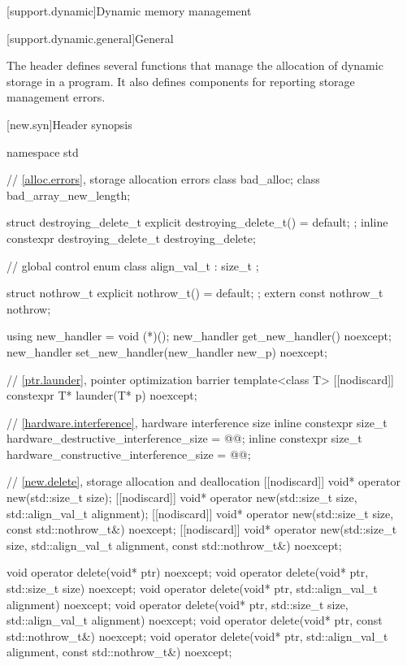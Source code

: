 
[support.dynamic]{Dynamic memory management}

[support.dynamic.general]{General}

\pnum
The header  defines several
functions that manage the allocation of dynamic storage in a program.
It also defines components for reporting storage management errors.

[new.syn]{Header  synopsis}
\begin{codeblock}
namespace std {
  // \ref{alloc.errors}, storage allocation errors
  class bad_alloc;
  class bad_array_new_length;

  struct destroying_delete_t {
    explicit destroying_delete_t() = default;
  };
  inline constexpr destroying_delete_t destroying_delete{};

  // global  control%
  enum class align_val_t : size_t {};

  struct nothrow_t { explicit nothrow_t() = default; };
  extern const nothrow_t nothrow;

  using new_handler = void (*)();
  new_handler get_new_handler() noexcept;
  new_handler set_new_handler(new_handler new_p) noexcept;

  // \ref{ptr.launder}, pointer optimization barrier
  template<class T> [[nodiscard]] constexpr T* launder(T* p) noexcept;

  // \ref{hardware.interference}, hardware interference size
  inline constexpr size_t hardware_destructive_interference_size = @\impdef{}@;
  inline constexpr size_t hardware_constructive_interference_size = @\impdef{}@;
}

// \ref{new.delete}, storage allocation and deallocation
[[nodiscard]] void* operator new(std::size_t size);
[[nodiscard]] void* operator new(std::size_t size, std::align_val_t alignment);
[[nodiscard]] void* operator new(std::size_t size, const std::nothrow_t&) noexcept;
[[nodiscard]] void* operator new(std::size_t size, std::align_val_t alignment,
                                 const std::nothrow_t&) noexcept;

void  operator delete(void* ptr) noexcept;
void  operator delete(void* ptr, std::size_t size) noexcept;
void  operator delete(void* ptr, std::align_val_t alignment) noexcept;
void  operator delete(void* ptr, std::size_t size, std::align_val_t alignment) noexcept;
void  operator delete(void* ptr, const std::nothrow_t&) noexcept;
void  operator delete(void* ptr, std::align_val_t alignment, const std::nothrow_t&) noexcept;


\end{codeblock}
